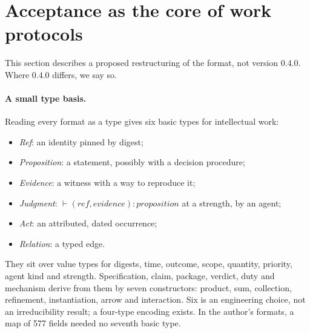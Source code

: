 \documentclass[11pt]{article}
\theoremstyle{definition}
\theoremstyle{remark}
\begin{document}
\section{Acceptance as the core of work protocols}\label{sec:protocols}

This section describes a proposed restructuring of the format, not version 0.4.0. Where 0.4.0
differs, we say so.

\paragraph{A small type basis.} Reading every format as a type gives six basic types for
intellectual work:
\begin{itemize}[itemsep=1pt]
\item \emph{Ref}: an identity pinned by digest;
\item \emph{Proposition}: a statement, possibly with a decision procedure;
\item \emph{Evidence}: a witness with a way to reproduce it;
\item \emph{Judgment}: $\vdash(\mathit{ref},\mathit{evidence}):\mathit{proposition}$ at a strength,
  by an agent;
\item \emph{Act}: an attributed, dated occurrence;
\item \emph{Relation}: a typed edge.
\end{itemize}
They sit over value types for digests, time, outcome, scope, quantity, priority, agent kind and
strength. Specification, claim, package, verdict, duty and mechanism derive from them by seven
constructors: product, sum, collection, refinement, instantiation, arrow and interaction. Six is an
engineering choice, not an irreducibility result; a four-type encoding exists. In the author's
formats, a map of 577 fields needed no seventh basic type.
\end{document}
